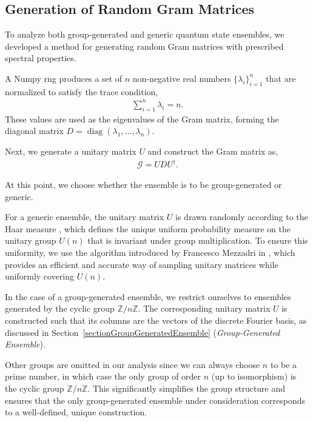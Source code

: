 \documentclass[12pt,letterpaper]{article}
\begin{document}
\begin{multicols}{2}
\subsection{Generation of Random Gram Matrices}

To analyze both group-generated and generic quantum state ensembles, we developed a method for generating random Gram matrices with prescribed spectral properties.

A Numpy \gls{rng}\cite{numpyRNG} produces a set of $n$ non-negative real numbers $\{\lambda_i\}_{i=1}^n$ that are normalized to satisfy the trace condition,
\begin{align*}
	\sum_{i=1}^n \lambda_i = n.
\end{align*}
These values are used as the eigenvalues of the Gram matrix, forming the diagonal matrix $D = \operatorname{diag}(\lambda_1, \dots, \lambda_n)$. 

Next, we generate a unitary matrix $U$ and construct the Gram matrix as,
\begin{align*}
	\mathcal{G} = U D U^\dagger.
\end{align*}

At this point, we choose whether the ensemble is to be group-generated or generic.

For a generic ensemble, the unitary matrix $U$ is drawn randomly according to the Haar measure \cite{haarMeasure}, which defines the unique uniform probability measure on the unitary group $U(n)$ that is invariant under group multiplication. To ensure this uniformity, we use the algorithm introduced by Francesco Mezzadri in \cite{UnitaryMatricesGeneration}, which provides an efficient and accurate way of sampling unitary matrices while uniformly covering $U(n)$.

In the case of a group-generated ensemble, we restrict ourselves to ensembles generated by the cyclic group $\mathbb{Z}/n\mathbb{Z}$. The corresponding unitary matrix $U$ is constructed such that its columns are the vectors of the discrete Fourier basis, as discussed in Section~\ref{sectionGroupGeneratedEnsemble} (\emph{Group-Generated Ensemble}).

Other groups are omitted in our analysis since we can always choose $n$ to be a prime number, in which case the only group of order $n$ (up to isomorphism) is the cyclic group $\mathbb{Z}/n\mathbb{Z}$. This significantly simplifies the group structure and ensures that the only group-generated ensemble under consideration corresponds to a well-defined, unique construction.


\end{multicols}
\end{document}
